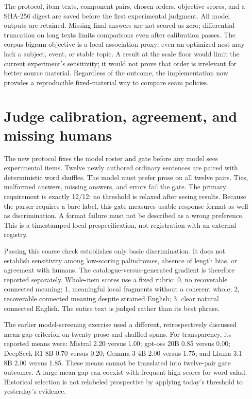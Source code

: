 \documentclass[11pt,letterpaper]{article}
\newcommand{\pageend}{\clearpage}
\begin{document}


The protocol, item texts, component pairs, chosen orders, objective scores, and a SHA-256 digest are saved before the first experimental judgment. All model outputs are retained. Missing final answers are not scored as zero; differential truncation on long texts limits comparisons even after calibration passes. The corpus bigram objective is a local association proxy: even an optimized nest may lack a subject, event, or stable topic. A result at the scale floor would limit the current experiment's sensitivity; it would not prove that order is irrelevant for better source material. Regardless of the outcome, the implementation now provides a reproducible fixed-material way to compare seam policies.
\pageend

\section{Judge calibration, agreement, and missing humans}
\label{sec:judges}
The new protocol fixes the model roster and gate before any model sees experimental items. Twelve newly authored ordinary sentences are paired with deterministic word shuffles. The model must prefer prose on all twelve pairs. Ties, malformed answers, missing answers, and errors fail the gate. The primary requirement is exactly 12/12; no threshold is relaxed after seeing results. Because the parser requires a bare label, this gate measures usable response format as well as discrimination. A format failure must not be described as a wrong preference. This is a timestamped local prespecification, not registration with an external registry.

Passing this coarse check establishes only basic discrimination. It does not establish sensitivity among low-scoring palindromes, absence of length bias, or agreement with humans. The catalogue-versus-generated gradient is therefore reported separately. Whole-item scores use a fixed rubric: 0, no recoverable connected meaning; 1, meaningful local fragments without a coherent whole; 2, recoverable connected meaning despite strained English; 3, clear natural connected English. The entire text is judged rather than its best phrase.



The earlier model-screening exercise used a different, retrospectively discussed mean-gap criterion on twenty prose and shuffled spans. For transparency, its reported means were: Mistral 2.20 versus 1.00; gpt-oss 20B 0.85 versus 0.00; DeepSeek R1 8B 0.70 versus 0.20; Gemma 3 4B 2.00 versus 1.75; and Llama 3.1 8B 2.00 versus 1.85. These means cannot be translated into twelve-pair gate outcomes. A large mean gap can coexist with frequent high scores for word salad. Historical selection is not relabeled prospective by applying today's threshold to yesterday's evidence.
\end{document}
